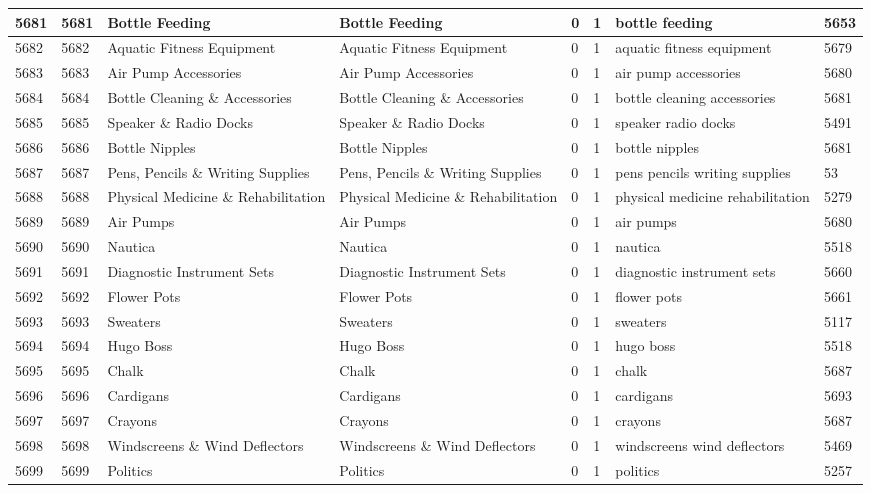 \begin{longtable}{|l|l|l|l|l|l|l|l|}
5681 & 5681 & Bottle Feeding & Bottle Feeding & 0 & 1 & bottle feeding & 5653 \\ \hline 
5682 & 5682 & Aquatic Fitness Equipment & Aquatic Fitness Equipment & 0 & 1 & aquatic fitness equipment & 5679 \\ \hline 
5683 & 5683 & Air Pump Accessories & Air Pump Accessories & 0 & 1 & air pump accessories & 5680 \\ \hline 
5684 & 5684 & Bottle Cleaning \& Accessories & Bottle Cleaning \& Accessories & 0 & 1 & bottle cleaning accessories & 5681 \\ \hline 
5685 & 5685 & Speaker \& Radio Docks & Speaker \& Radio Docks & 0 & 1 & speaker radio docks & 5491 \\ \hline 
5686 & 5686 & Bottle Nipples & Bottle Nipples & 0 & 1 & bottle nipples & 5681 \\ \hline 
5687 & 5687 & Pens, Pencils \& Writing Supplies & Pens, Pencils \& Writing Supplies & 0 & 1 & pens pencils writing supplies & 53 \\ \hline 
5688 & 5688 & Physical Medicine \& Rehabilitation & Physical Medicine \& Rehabilitation & 0 & 1 & physical medicine rehabilitation & 5279 \\ \hline 
5689 & 5689 & Air Pumps & Air Pumps & 0 & 1 & air pumps & 5680 \\ \hline 
5690 & 5690 & Nautica & Nautica & 0 & 1 & nautica & 5518 \\ \hline 
5691 & 5691 & Diagnostic Instrument Sets & Diagnostic Instrument Sets & 0 & 1 & diagnostic instrument sets & 5660 \\ \hline 
5692 & 5692 & Flower Pots & Flower Pots & 0 & 1 & flower pots & 5661 \\ \hline 
5693 & 5693 & Sweaters & Sweaters & 0 & 1 & sweaters & 5117 \\ \hline 
5694 & 5694 & Hugo Boss & Hugo Boss & 0 & 1 & hugo boss & 5518 \\ \hline 
5695 & 5695 & Chalk & Chalk & 0 & 1 & chalk & 5687 \\ \hline 
5696 & 5696 & Cardigans & Cardigans & 0 & 1 & cardigans & 5693 \\ \hline 
5697 & 5697 & Crayons & Crayons & 0 & 1 & crayons & 5687 \\ \hline 
5698 & 5698 & Windscreens \& Wind Deflectors & Windscreens \& Wind Deflectors & 0 & 1 & windscreens wind deflectors & 5469 \\ \hline 
5699 & 5699 & Politics & Politics & 0 & 1 & politics & 5257 \\ \hline 

\end{longtable}

